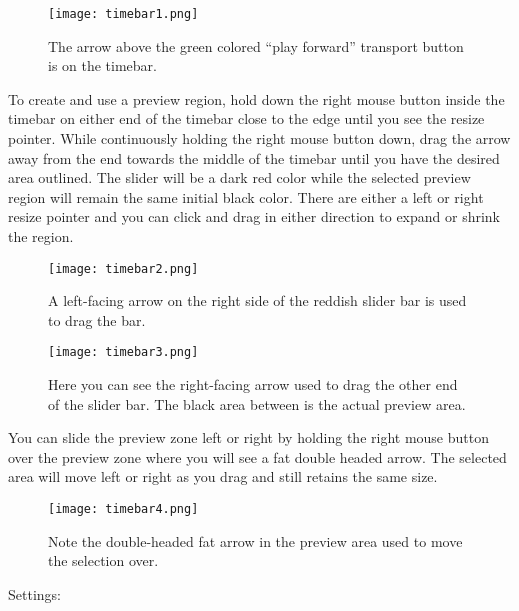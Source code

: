 \begin{figure}[htpb]
    \centering
    \texttt{[image: timebar1.png]}
    \caption{The arrow above the green colored “play forward” transport button is on the timebar.}
    \label{fig:timebar1}
\end{figure}

To create and use a preview region, hold down the right mouse button inside the timebar on either end of the timebar close to the edge until you see the resize pointer.  
While continuously holding the right mouse button down, drag the arrow away from the end towards the middle of the timebar until you have the desired area outlined.  
The slider will be a dark red color while the selected preview region will remain the same initial black color.  
There are either a left or right resize pointer and you can click and drag in either direction to expand or shrink the region.

\begin{figure}[htpb]
    \centering
    \texttt{[image: timebar2.png]}
    \caption{A left-facing arrow on the right side of the reddish slider bar is used to drag the bar.}
    \label{fig:timebar2}
\end{figure}

\begin{figure}[htpb]
    \centering
    \texttt{[image: timebar3.png]}
    \caption{Here you can see the right-facing arrow used to drag the other end of the slider bar.  
        The black area between is the actual preview area.}
    \label{fig:timebar3}
\end{figure}

You can slide the preview zone left or right by holding the right mouse button over the preview zone where you will see a fat double headed arrow.  
The selected area will move left or right as you drag and still retains the same size.

\begin{figure}[htpb]
    \centering
    \texttt{[image: timebar4.png]}
    \caption{Note the double-headed fat arrow in the preview area used  to move the selection over.}
    \label{fig:timebar4}
\end{figure}

Settings:

